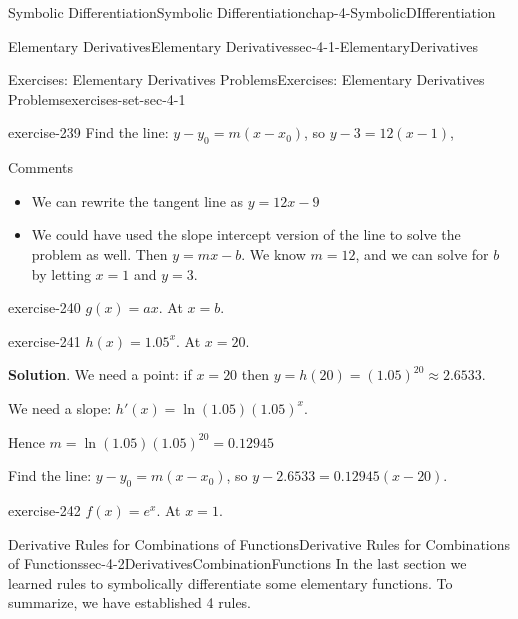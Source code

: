 \documentclass[oneside,10pt,]{book}
\numberwithin{equation}{section}
\begin{document}
\begin{chapterptx}{Symbolic Differentiation}{}{Symbolic Differentiation}{}{}{chap-4-SymbolicDIfferentiation}
\begin{sectionptx}{Elementary Derivatives}{}{Elementary Derivatives}{}{}{sec-4-1-ElementaryDerivatives}
\begin{exercises-subsection-numberless}{Exercises: Elementary Derivatives Problems}{}{Exercises: Elementary Derivatives Problems}{}{}{exercises-set-sec-4-1}
\begin{divisionexercise}{19}{}{}{exercise-239}
\hypertarget{p-1507}{}%
Find the line: \(y-y_0=m(x-x_0 )\),  so \(y-3=12(x-1)\),%
\par
\hypertarget{p-1508}{}%
Comments%
\leavevmode%
\begin{itemize}[label=\textbullet]
\item{}\hypertarget{p-1509}{}%
We can rewrite the tangent line as \(y=12x-9\)%
\item{}\hypertarget{p-1510}{}%
We could have used the slope intercept version of the line to solve the problem as well. Then \(y=mx-b\). We know \(m = 12\), and we can solve for \(b\) by letting \(x = 1\) and \(y = 3\).%
\end{itemize}
\end{divisionexercise}%
\begin{divisionexercise}{20}{}{}{exercise-240}%
\hypertarget{p-1511}{}%
\(g(x)=a x\).  At \(x=b\).%
\end{divisionexercise}%
\begin{divisionexercise}{21}{}{}{exercise-241}%
\hypertarget{p-1512}{}%
\(h(x)=1.05^x\).  At \(x=20\).%
\par\smallskip%
\noindent\textbf{Solution}.\hypertarget{solution-120}{}\quad%
\hypertarget{p-1513}{}%
We need a point: if \(x =20\) then \(y=h(20)=(1.05)^20\approx 2.6533\).%
\par
\hypertarget{p-1514}{}%
We need a slope: \(h'(x)=\ln(1.05) (1.05)^x\).%
\par
\hypertarget{p-1515}{}%
Hence \(m=\ln(1.05) (1.05)^{20}=0.12945\)%
\par
\hypertarget{p-1516}{}%
Find the line: \(y-y_0=m(x-x_0 )\),  so \(y-2.6533=0.12945(x-20)\).%
\end{divisionexercise}%
\begin{divisionexercise}{22}{}{}{exercise-242}%
\hypertarget{p-1517}{}%
\(f(x)=e^x\).  At \(x=1\).%
\end{divisionexercise}%
\end{exercises-subsection-numberless}
\end{sectionptx}
%
%
\typeout{************************************************}
\typeout{************************************************}
%
\begin{sectionptx}{Derivative Rules for Combinations of Functions}{}{Derivative Rules for Combinations of Functions}{}{}{sec-4-2DerivativesCombinationFunctions}
\hypertarget{p-1518}{}%
In the last section we learned rules to symbolically differentiate some elementary functions.  To summarize, we have established 4 rules.%

\end{sectionptx}
\end{chapterptx}
\end{document}
